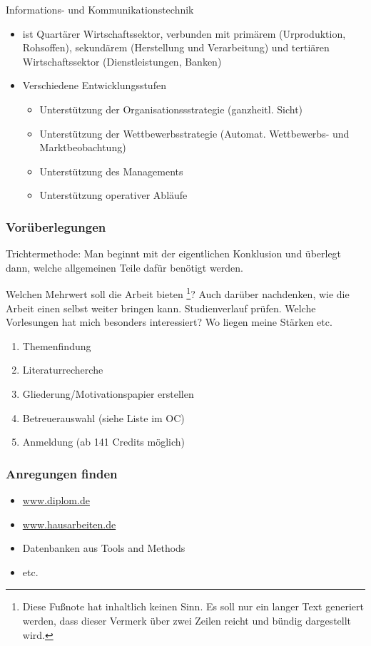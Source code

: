 Informations- und Kommunikationstechnik
\begin{itemize}
    \item ist Quartärer Wirtschaftssektor, verbunden mit primärem (Urproduktion, Rohsoffen), sekundärem (Herstellung und Verarbeitung) und tertiären Wirtschaftssektor (Dienstleistungen, Banken)
    \item Verschiedene Entwicklungsstufen
    \begin{itemize}
        \item Unterstützung der Organisationssstrategie (ganzheitl. Sicht)
        \item Unterstützung der Wettbewerbsstrategie (Automat. Wettbewerbs- und Marktbeobachtung)
        \item Unterstützung des Managements
        \item Unterstützung operativer Abläufe
    \end{itemize}
\end{itemize}




\subsubsection{Vorüberlegungen}
Trichtermethode: Man beginnt mit der eigentlichen  Konklusion und überlegt dann, welche allgemeinen Teile dafür benötigt werden.

Welchen Mehrwert soll die Arbeit bieten \footnote{Diese Fu\ss note hat inhaltlich keinen Sinn. Es soll nur ein langer Text generiert werden, dass dieser Vermerk über zwei Zeilen reicht und bündig dargestellt wird.}? Auch darüber nachdenken, wie die Arbeit einen selbst weiter bringen kann. Studienverlauf prüfen. Welche Vorlesungen hat mich besonders interessiert? Wo liegen meine Stärken etc.

\begin{enumerate}
\item Themenfindung
\item Literaturrecherche
\item Gliederung/Motivationspapier erstellen
\item Betreuerauswahl (siehe Liste im \ac{OC})
\item Anmeldung (ab 141 Credits möglich)
\end{enumerate}

\subsubsection{Anregungen finden}
\begin{itemize}
\item \href{http://www.diplom.de}{www.diplom.de}
\item \href{http://www.hausarbeiten.de}{www.hausarbeiten.de}
\item Datenbanken aus Tools and Methods
\item etc.
\end{itemize}

